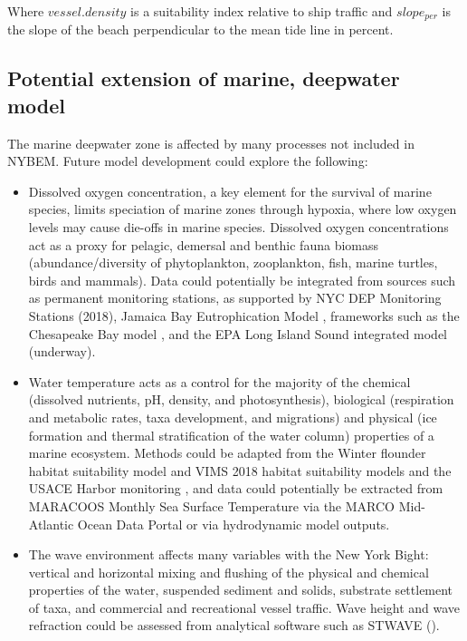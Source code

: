 \documentclass[
]{book}
\providecommand{\tightlist}{%
  \setlength{\itemsep}{0pt}\setlength{\parskip}{0pt}}
\begin{document}
Where \(vessel.density\) is a suitability index relative to ship traffic and \(slope_{per}\) is the slope of the beach perpendicular to the mean tide line in percent.

\hypertarget{potential-extension-of-marine-deepwater-model}{%
\subsection{Potential extension of marine, deepwater model}\label{potential-extension-of-marine-deepwater-model}}

The marine deepwater zone is affected by many processes not included in NYBEM. Future model development could explore the following:

\begin{itemize}
\tightlist
\item
  Dissolved oxygen concentration, a key element for the survival of marine species, limits speciation of marine zones through hypoxia, where low oxygen levels may cause die-offs in marine species. Dissolved oxygen concentrations act as a proxy for pelagic, demersal and benthic fauna biomass (abundance/diversity of phytoplankton, zooplankton, fish, marine turtles, birds and mammals). Data could potentially be integrated from sources such as permanent monitoring stations, as supported by NYC DEP Monitoring Stations (2018), Jamaica Bay Eutrophication Model \citep{fischbach_building_2018}, frameworks such as the Chesapeake Bay model \citep{cerco_threedimensional_1993}, and the EPA Long Island Sound integrated model (underway).\\
\item
  Water temperature acts as a control for the majority of the chemical (dissolved nutrients, pH, density, and photosynthesis), biological (respiration and metabolic rates, taxa development, and migrations) and physical (ice formation and thermal stratification of the water column) properties of a marine ecosystem. Methods could be adapted from the Winter flounder habitat suitability model \citep{banner_usfws_2001} and VIMS 2018 habitat suitability models and the USACE Harbor monitoring \citep{usace_essential_2013}, and data could potentially be extracted from MARACOOS Monthly Sea Surface Temperature via the MARCO Mid-Atlantic Ocean Data Portal or via hydrodynamic model outputs.\\
\item
  The wave environment affects many variables with the New York Bight: vertical and horizontal mixing and flushing of the physical and chemical properties of the water, suspended sediment and solids, substrate settlement of taxa, and commercial and recreational vessel traffic. Wave height and wave refraction could be assessed from analytical software such as STWAVE (\citet{byrnes_effects_2004}).\\

\end{itemize}
\end{document}
